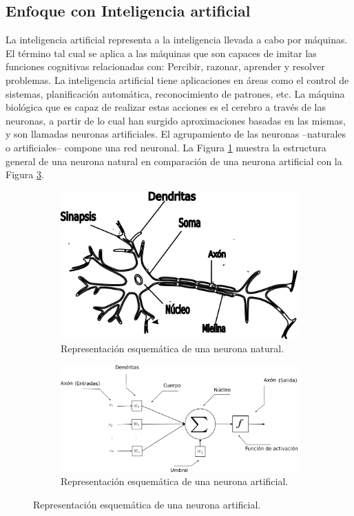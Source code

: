 \subsection{Enfoque con Inteligencia artificial}
La inteligencia artificial representa a la inteligencia llevada a cabo por máquinas. El término tal cual se aplica a las máquinas que son capaces de imitar las funciones cognitivas relacionadas con: Percibir, razonar, aprender y resolver problemas. La inteligencia artificial tiene aplicaciones en áreas como el control de sistemas, planificación automática, reconocimiento de patrones, etc. La máquina biológica que es capaz de realizar estas acciones es el cerebro a través de las neuronas, a partir de lo cual han surgido aproximaciones basadas en las mismas, y son llamadas neuronas artificiales. El agrupamiento de las neuronas --naturales o artificiales-- compone una red neuronal. La Figura \ref{fig:RNN} muestra la estructura general de una neurona natural en comparación de una neurona artificial con la Figura \ref{fig:RNA}.
\begin{figure}[htbp!]
	\centering
	\begin{subfigure}[h]{0.4\textwidth}
		\centering
		\includegraphics[width=\textwidth]{./Figuras/RNN}
		\caption{Representación esquemática de una neurona natural.}
		\label{fig:RNN}
	\end{subfigure}
	\begin{subfigure}[h]{0.5\textwidth}
		\centering
		\includegraphics[width=\textwidth]{./Figuras/RNA}
		\caption{Representación esquemática de una neurona artificial.}
		\label{fig:RNA}
	\end{subfigure}
\end{figure}
